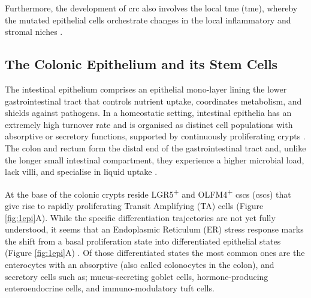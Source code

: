 Furthermore, the development of \acrshort{crc} also involves the local \acrlong{tme} (\acrshort{tme}), whereby the mutated epithelial cells orchestrate changes in the local inflammatory and stromal niches \cite{peddareddigari_tumor_2010}.


\subsection{The Colonic Epithelium and its Stem Cells}



The intestinal epithelium comprises an epithelial mono-layer lining the lower gastrointestinal tract that controls nutrient uptake, coordinates metabolism, and shields against pathogens. In a homeostatic setting, intestinal epithelia has an extremely high turnover rate and is organised as distinct cell populations with absorptive or secretory functions, supported by continuously proliferating crypts \cite{bonis_intestinal_2021}. The colon and rectum form the distal end of the gastrointestinal tract and, unlike the longer small intestinal compartment, they experience a higher microbial load, lack villi, and specialise in liquid uptake \cite{kiela_physiology_2016}.

At the base of the colonic crypts reside LGR5\textsuperscript{+} and OLFM4\textsuperscript{+} \acrlong{csc}s (\acrshort{csc}s) that give rise to rapidly proliferating Transit Amplifying (TA) cells (Figure \ref{fig:1epi}A). While the specific differentiation trajectories are not yet fully understood, it seems that an Endoplasmic Reticulum (ER) stress response marks the shift from a basal proliferation state into differentiated epithelial states (Figure \ref{fig:1epi}A) \cite{heijmans_er_2013, coleman_er_2019}. Of those differentiated states the most common ones are the enterocytes with an absorptive (also called colonocytes in the colon), and secretory cells such as; mucus-secreting goblet cells, hormone-producing enteroendocrine cells, and immuno-modulatory tuft cells. 

